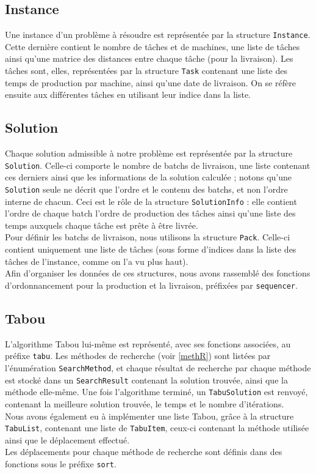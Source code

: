 \documentclass[hideweeklyreports]{polytech/polytech}
\newcommand{\codec}[1]{\texttt{#1}}
\begin{document}
			\subsection{Instance}
				Une instance d'un problème à résoudre est représentée par la structure \codec{Instance}. Cette dernière contient le nombre de tâches et de machines, une liste de tâches ainsi qu'une matrice des distances entre chaque tâche (pour la livraison).
				Les tâches sont, elles, représentées par la structure \codec{Task} contenant une liste des temps de production par machine, ainsi qu'une date de livraison. On se réfère ensuite aux différentes tâches en utilisant leur indice dans la liste.
				
			\subsection{Solution}
				Chaque solution admissible à notre problème est représentée par la structure \codec{Solution}. Celle-ci comporte le nombre de batchs de livraison, une liste contenant ces derniers ainsi que les informations de la solution calculée ; notons qu'une \codec{Solution} seule ne décrit que l'ordre et le contenu des batchs, et non l'ordre interne de chacun. Ceci est le rôle de la structure \codec{SolutionInfo} : elle contient l'ordre de chaque batch l'ordre de production des tâches ainsi qu'une liste des temps auxquels chaque tâche est prête à être livrée.\\
				Pour définir les batchs de livraison, nous utilisons la structure \codec{Pack}. Celle-ci contient uniquement une liste de tâches (sous forme d'indices dans la liste des tâches de l'instance, comme on l'a vu plus haut).\\
				Afin d'organiser les données de ces structures, nous avons rassemblé des fonctions d'ordonnancement pour la production et la livraison, préfixées par \codec{sequencer}.
				
			\subsection{Tabou}
				L'algorithme Tabou lui-même est représenté, avec ses fonctions associées, au préfixe \codec{tabu}. Les méthodes de recherche (voir \autoref{methR}) sont listées par l'énumération \codec{SearchMethod}, et chaque résultat de recherche par chaque méthode est stocké dans un \codec{SearchResult} contenant la solution trouvée, ainsi que la méthode elle-même. Une fois l'algorithme terminé, un \codec{TabuSolution} est renvoyé, contenant la meilleure solution trouvée, le temps et le nombre d'itérations.\\
				Nous avons également eu à implémenter une liste Tabou, grâce à la structure \codec{TabuList}, contenant une liste de \codec{TabuItem}, ceux-ci contenant la méthode utilisée ainsi que le déplacement effectué.\\
				Les déplacements pour chaque méthode de recherche sont définis dans des fonctions sous le préfixe \codec{sort}.
\end{document}

